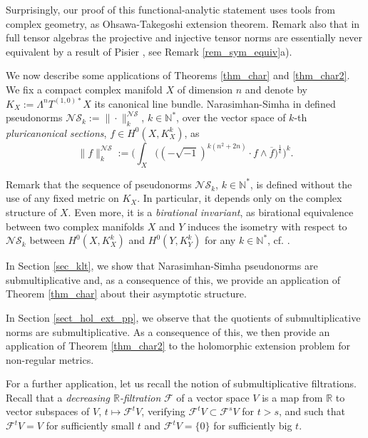 \documentclass[12pt]{article}
\numberwithin{equation}{section}
\theoremstyle{theorem}
\theoremstyle{definition}
\theoremstyle{remark}
\newcommand{\imun} {\sqrt{-1}}
\newcommand{\real}{\mathbb{R}}
\newcommand{\nat}{\mathbb{N}}
\begin{document}
	Surprisingly, our proof of this functional-analytic statement uses tools from complex geometry, as Ohsawa-Takegoshi extension theorem.
	Remark also that in full tensor algebras the projective and injective tensor norms are essentially never equivalent by a result of Pisier \cite{PisierDecart}, see Remark \ref{rem_sym_equiv}a).
	\begin{sloppypar}
	We now describe some applications of Theorems \ref{thm_char} and \ref{thm_char2}.
	We fix a compact complex manifold $X$ of dimension $n$ and denote by $K_X := \Lambda^{n} T^{(1, 0)*}X$ its canonical line bundle.
	Narasimhan-Simha in \cite{NarSimh} defined pseudonorms $\mathcal{NS}_k := \| \cdot \|^{\mathcal{NS}}_{k}$, $k \in \nat^*$, over the vector space of $k$-th \textit{pluricanonical sections}, $f \in H^0(X, K_X^k)$, as 
	\begin{equation}\label{eq_ns_defn}
		\| f \|^{\mathcal{NS}}_{k}
		:=
		\Big( \int_X  \big( (- \imun)^{k(n^2 + 2n)} \cdot f \wedge \overline{f} \big)^{\frac{1}{k}} \Big)^{k}.
	\end{equation}
	\end{sloppypar}
	\par 
	Remark that the sequence of pseudonorms $\mathcal{NS}_k$, $k \in \nat^*$, is defined without the use of any fixed metric on $K_X$.
	In particular, it depends only on the complex structure of $X$. 
	Even more, it is a \textit{birational invariant}, as birational equivalence between two complex manifolds $X$ and $Y$ induces the isometry with respect to $\mathcal{NS}_k$ between $H^0(X, K_X^k)$ and $H^0(Y, K_Y^k)$ for any $k \in \nat^*$, cf. \cite{NarSimh}.
	\par 
	In Section \ref{sec_klt}, we show that Narasimhan-Simha pseudonorms are submultiplicative and, as a consequence of this, we provide an application of Theorem \ref{thm_char} about their asymptotic structure.
	\par 
	In Section \ref{sect_hol_ext_pp}, we observe that the quotients of submultiplicative norms are submultiplicative.
	As a consequence of this, we then provide an application of Theorem \ref{thm_char2} to the holomorphic extension problem for non-regular metrics.
	\par 
	For a further application, let us recall the notion of submultiplicative filtrations.
	Recall that a \textit{decreasing $\real$-filtration} $\mathcal{F}$ of a vector space $V$ is a map from $\real$ to vector subspaces of $V$, $t \mapsto \mathcal{F}^t V$, verifying $\mathcal{F}^t V \subset \mathcal{F}^s V$ for $t > s$, and such that $\mathcal{F}^t V  = V$ for sufficiently small $t$ and $\mathcal{F}^t V = \{0\}$ for sufficiently big $t$.
\end{document}
